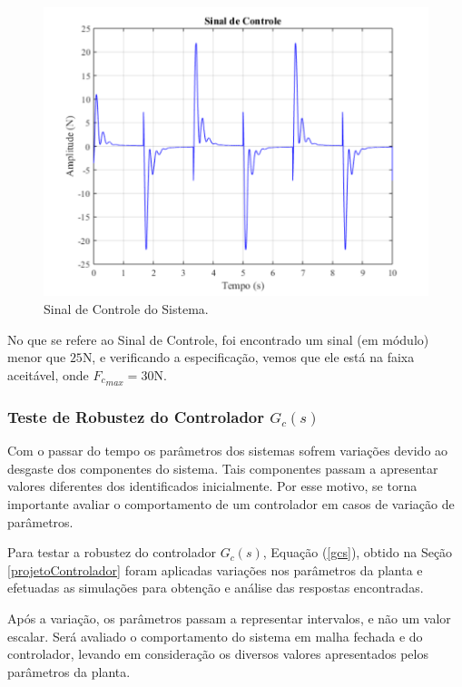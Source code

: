 \documentclass[journal,brazil,english]{IEEEtran}
\begin{document}
\begin{figure}[H]
	\centering
\includegraphics[width=\columnwidth]{./imagens/sinal_de_controle.pdf}
    \renewcommand{\figurename}{Fig.}
    \caption{Sinal de Controle do Sistema.}
	\label{sinalcontrole}
\end{figure}

No que se refere ao Sinal de Controle, foi encontrado um sinal (em módulo) menor que $25$N, e verificando a especificação, vemos que ele está na faixa aceitável, onde ${F_{c}}_{max} = 30$N.

\subsubsection{Teste de Robustez do Controlador $G_c(s)$}
Com o passar do tempo os parâmetros dos sistemas sofrem variações devido ao desgaste dos componentes do sistema. Tais componentes passam a apresentar valores diferentes dos identificados inicialmente. Por esse motivo, se torna importante avaliar o comportamento de um controlador em casos de variação de parâmetros.

Para testar a robustez do controlador $G_c(s)$, Equação (\ref{gcs}), obtido na Seção \ref{projetoControlador} foram aplicadas variações nos parâmetros da planta e efetuadas as simulações para obtenção e análise das respostas encontradas.

Após a variação, os parâmetros passam a representar intervalos, e não um valor escalar. Será avaliado o comportamento do sistema em malha fechada e do controlador, levando em consideração os diversos valores apresentados pelos parâmetros da planta.
\end{document}
